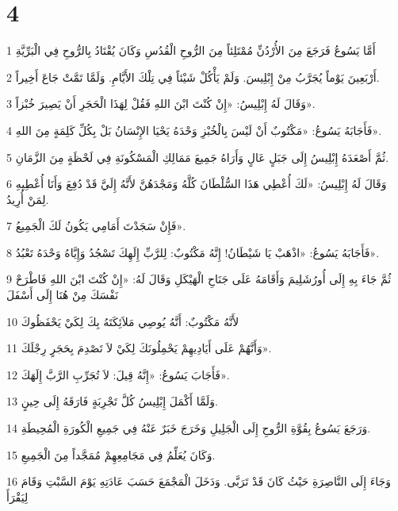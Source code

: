 \chapter{4}

\par 1 أَمَّا يَسُوعُ فَرَجَعَ مِنَ الأُرْدُنِّ مُمْتَلِئاً مِنَ الرُّوحِ الْقُدُسِ وَكَانَ يُقْتَادُ بِالرُّوحِ فِي الْبَرِّيَّةِ
\par 2 أَرْبَعِينَ يَوْماً يُجَرَّبُ مِنْ إِبْلِيسَ. وَلَمْ يَأْكُلْ شَيْئاً فِي تِلْكَ الأَيَّامِ. وَلَمَّا تَمَّتْ جَاعَ أَخِيراً.
\par 3 وَقَالَ لَهُ إِبْلِيسُ: «إِنْ كُنْتَ ابْنَ اللهِ فَقُلْ لِهَذَا الْحَجَرِ أَنْ يَصِيرَ خُبْزاً».
\par 4 فَأَجَابَهُ يَسُوعُ: «مَكْتُوبٌ أَنْ لَيْسَ بِالْخُبْزِ وَحْدَهُ يَحْيَا الإِنْسَانُ بَلْ بِكُلِّ كَلِمَةٍ مِنَ اللهِ».
\par 5 ثُمَّ أَصْعَدَهُ إِبْلِيسُ إِلَى جَبَلٍ عَالٍ وَأَرَاهُ جَمِيعَ مَمَالِكِ الْمَسْكُونَةِ فِي لَحْظَةٍ مِنَ الزَّمَانِ.
\par 6 وَقَالَ لَهُ إِبْلِيسُ: «لَكَ أُعْطِي هَذَا السُّلْطَانَ كُلَّهُ وَمَجْدَهُنَّ لأَنَّهُ إِلَيَّ قَدْ دُفِعَ وَأَنَا أُعْطِيهِ لِمَنْ أُرِيدُ.
\par 7 فَإِنْ سَجَدْتَ أَمَامِي يَكُونُ لَكَ الْجَمِيعُ».
\par 8 فَأَجَابَهُ يَسُوعُ: «اذْهَبْ يَا شَيْطَانُ! إِنَّهُ مَكْتُوبٌ: لِلرَّبِّ إِلَهِكَ تَسْجُدُ وَإِيَّاهُ وَحْدَهُ تَعْبُدُ».
\par 9 ثُمَّ جَاءَ بِهِ إِلَى أُورُشَلِيمَ وَأَقَامَهُ عَلَى جَنَاحِ الْهَيْكَلِ وَقَالَ لَهُ: «إِنْ كُنْتَ ابْنَ اللهِ فَاطْرَحْ نَفْسَكَ مِنْ هُنَا إِلَى أَسْفَلَ
\par 10 لأَنَّهُ مَكْتُوبٌ: أَنَّهُ يُوصِي مَلاَئِكَتَهُ بِكَ لِكَيْ يَحْفَظُوكَ
\par 11 وَأَنَّهُمْ عَلَى أَيَادِيهِمْ يَحْمِلُونَكَ لِكَيْ لاَ تَصْدِمَ بِحَجَرٍ رِجْلَكَ».
\par 12 فَأَجَابَ يَسُوعُ: «إِنَّهُ قِيلَ: لاَ تُجَرِّبِ الرَّبَّ إِلَهَكَ».
\par 13 وَلَمَّا أَكْمَلَ إِبْلِيسُ كُلَّ تَجْرِبَةٍ فَارَقَهُ إِلَى حِينٍ.
\par 14 وَرَجَعَ يَسُوعُ بِقُوَّةِ الرُّوحِ إِلَى الْجَلِيلِ وَخَرَجَ خَبَرٌ عَنْهُ فِي جَمِيعِ الْكُورَةِ الْمُحِيطَةِ.
\par 15 وَكَانَ يُعَلِّمُ فِي مَجَامِعِهِمْ مُمَجَّداً مِنَ الْجَمِيعِ.
\par 16 وَجَاءَ إِلَى النَّاصِرَةِ حَيْثُ كَانَ قَدْ تَرَبَّى. وَدَخَلَ الْمَجْمَعَ حَسَبَ عَادَتِهِ يَوْمَ السَّبْتِ وَقَامَ لِيَقْرَأَ
